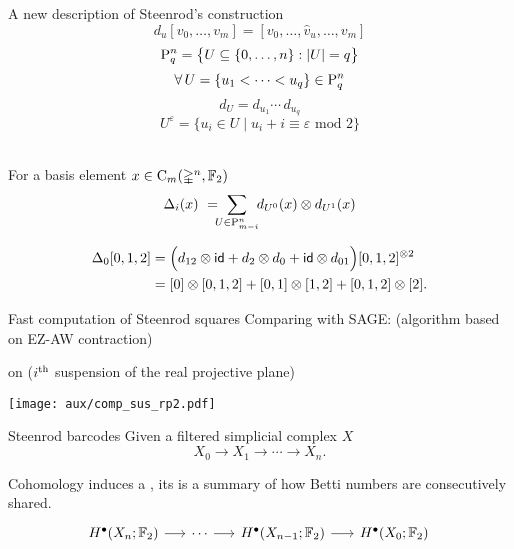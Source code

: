 \begin{frame}[fragile]{A new description of Steenrod's construction}
	\pause
	\[
	d_u[v_0, \dots, v_m] = [v_0, \dots, \widehat v_u, \dots, v_m]
	\]
	\pause\vspace*{-15pt}
	\[
	\rP_q^n = \set[\big]{U \subseteq \{0, \dots, n\} : \bars{U} = q}
	\]
	\pause\vspace*{-15pt}
	\[
	\forall \, U = \{u_1 < \dots < u_q\} \in \rP_q^n
	\]
	\pause\vspace*{-15pt}
	\[
	d_U = d_{u_1} \dotsm \, d_{u_q}
	\]
	\pause\vspace*{-15pt}
	\[
	U^\varepsilon = \big\{ u_i \in U \mid u_i + i \equiv \varepsilon \text{ mod } 2 \big\}
	\]

	\bigskip\pause
	 \\
	For a basis element $x \in \gchains_m(\gsimplex^n, \Ftwo)$
	\vspace*{-5pt}
	\[
	\Delta_i(x) \ = \!\!\! \sum_{U \in \rP_{m-i}^n} \!\! d_{U^0}(x) \otimes d_{U^1}(x)
	\]
	\vspace*{-10pt}

	\pause
	\vspace*{-5pt}
	\begin{align*}
	\Delta_0 [0,1,2] &=
	\Big( d_{12} \otimes \id + d_2 \otimes d_0 + \id \otimes d_{01} \Big) [0,1,2]^{\otimes 2} \\ &=
	[0] \otimes [0,1,2] + [0,1] \otimes [1,2] + [0,1,2] \otimes [2].
	\end{align*}
\end{frame}

\begin{frame}{Fast computation of Steenrod squares}
	\pause
	Comparing with SAGE: (algorithm based on EZ-AW contraction)

	\smallskip\pause
	 on  ($i^\th$ suspension of the real projective plane)

	\medskip
	\texttt{[image: aux/comp\_sus\_rp2.pdf]}
\end{frame}

\begin{frame}[fragile]{Steenrod barcodes}
	\pause
	Given a filtered simplicial complex $X$
	\[
	X_0 \to X_1 \to \cdots \to X_n.
	\]

	\pause
	Cohomology induces a , its  is a summary of how Betti numbers are consecutively shared.\\

	\smallskip
	\phantom{A cohomology operation induces an endomorphism}
	\[
	\begin{tikzcd}[column sep = 15]
		H^\bullet(X_n; \Ftwo) \arrow[r] & \cdots \arrow[r] & H^\bullet(X_{n-1}; \Ftwo) \arrow[r] & H^\bullet(X_0; \Ftwo) \\
		\phantom{H^\bullet(X_n; \Ftwo)} \arrow[u, "\phantom{\Sq^k}", phantom] & \phantom{\cdots} & \phantom{H^\bullet(X_{n-1}; \Ftwo)} & \phantom{H^\bullet(X_0; \Ftwo)} \arrow[u, "\phantom{\Sq^k}", phantom] \phantom{.}
	\end{tikzcd}
	\]
\end{frame}

